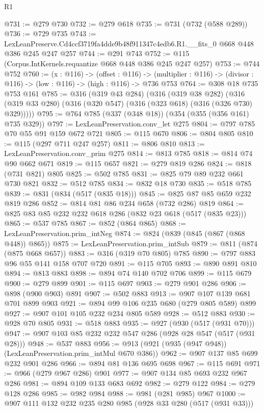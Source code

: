 \begin{lexlean}{R1}
\begin{coremodule}
@731 := @279 @730
@732 := @279 @618
@735 := @731 (@732 (@588 @289))
@736 := @729 @735
@743 := LexLeanPreserve.Cd4ccf3719fa4dde9b48f911347c4edb6.R1.__fits_0 @668 @448 @386 @245 @247 @257
@744 := @291 @743
@752 := @115 (Corpus.IntKernels.requantize @668 @448 @386 @245 @247 @257)
@753 := @744 @752
@760 := (x : @116) ->
  (offset : @116) ->
  (multiplier : @116) -> (divisor : @116) -> (low : @116) -> (high : @116) -> @736 @753
@764 := @308 @18 @735 @753 @161
@785 := @316
    (@319 @43 @284)
    (@316
      (@319 @38 @282)
      (@316 (@319 @33 @280) (@316 (@320 @547) (@316 (@323 @618) (@316 (@326 @730) @329)))))
@795 := @764 @785 (@337 (@348 @18)) (@354 (@355 (@356 @161) @735 @329))
@797 := LexLeanPreservation.conv_let @275
@804 := @797 @785 @70 @55 @91 @159 @672 @721
@805 := @115 @670
@806 := @804 @805
@810 := @115 (@297 @711 @247 @257)
@811 := @806 @810
@813 := LexLeanPreservation.conv_prim @275
@814 := @813 @785
@818 := @814 @74 @90 @662 @671
@819 := @115 @657
@821 := @279 @819 @286
@824 := @818 (@731 @821) @805
@825 := @502 @785
@831 := @825 @79 @89 @232 @661 @730 @821
@832 := @512 @785
@834 := @832 @18 @730
@835 := @518 @785
@839 := @831 (@834 (@517 (@835 @18)))
@845 := @825 @87 @85 @659 @232 @819 @286
@852 := @814 @81 @86 @234 @658 (@732 @286) @819
@864 := @825 @83 @85 @232 @232 @618 @286 (@832 @23 @618 (@517 (@835 @23)))
@865 := @537 @785
@867 := @852 (@864 @865)
@868 := LexLeanPreservation.prim_intNeg
@874 := @824 (@839 (@845 (@867 (@868 @448)) @865))
@875 := LexLeanPreservation.prim_intSub
@879 := @811 (@874 (@875 @668 @657))
@883 := @316 (@319 @70 @805) @785
@890 := @797 @883 @96 @55 @141 @158 @707 @720
@891 := @115 @705
@893 := @890 @891 @810
@894 := @813 @883
@898 := @894 @74 @140 @702 @706
@899 := @115 @679
@900 := @279 @899
@901 := @115 @697
@903 := @279 @901 @286
@906 := @898 (@900 @903) @891
@907 := @502 @883
@913 := @907 @107 @139 @681 @701 @899 @903
@921 := @894 @99 @106 @235 @680 (@279 @805 @589) @899
@927 := @907 @101 @105 @232 @234 @805 @589
@928 := @512 @883
@930 := @928 @70 @805
@931 := @518 @883
@935 := @927 (@930 (@517 (@931 @70)))
@947 := @907 @103 @85 @232 @232 @547 @286 (@928 @28 @547 (@517 (@931 @28)))
@948 := @537 @883
@956 := @913 (@921 (@935 (@947 @948)) (LexLeanPreservation.prim_intMul @670 @386))
@962 := @907 @137 @85 @699 @232 @901 @286
@966 := @894 @81 @136 @695 @698
@967 := @115 @691
@971 := @966 (@279 @967 @286) @901
@977 := @907 @134 @85 @693 @232 @967 @286
@981 := @894 @109 @133 @683 @692
@982 := @279 @122
@984 := @279 @128 @286
@985 := @982 @984
@988 := @981 (@281 @985) @967
@1000 := @907 @111 @132 @232 @235 @280 @985 (@928 @33 @280 (@517 (@931 @33)))

\end{coremodule}
\end{lexlean}
